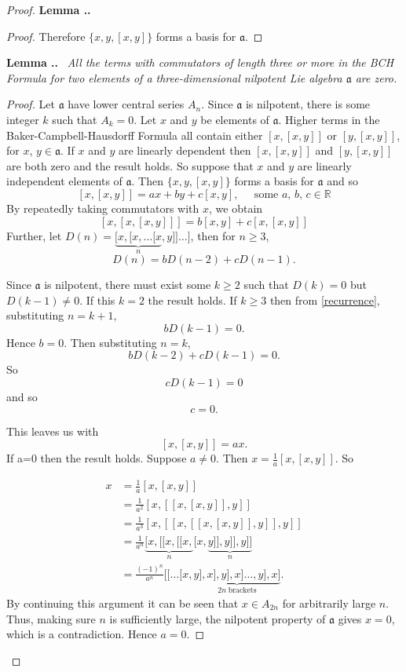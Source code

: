\documentclass[honours]{UNSWthesis}
\newcommand{\R}{\mathbb{R}}
\newcommand{\1}{\mathbf{e}_{1}}
\newcommand{\2}{\mathbf{e}_{3}}
\newcommand{\3}{\mathbf{e}_{3}}
\newcounter{Item}[section]
\newenvironment{Lemma}{\medskip
                            \refstepcounter{Item}
                            \noindent
                           {\bf Lemma \thesection.\theItem.}\ %
                            \begingroup \sl}
                           {\endgroup\medskip}
\begin{document}
\begin{proof}
\begin{Lemma}
\begin{proof}
 Therefore $\{x,y,[x,y]\}$ forms a basis for $\mathfrak{a}$.
\end{proof}
\end{Lemma}

\begin{Lemma}
All the terms with commutators of length three or more in the BCH Formula for two elements of a three-dimensional nilpotent Lie algebra $\mathfrak{a}$ are zero.

\begin{proof} 
Let $\mathfrak{a}$ have lower central series $A_{n}$. Since $\mathfrak{a}$ is nilpotent, there is some integer $k$ such that $A_{k}=0$.\newline
Let $x$ and $y$ be elements of $\mathfrak{a}$.
Higher terms in the Baker-Campbell-Hausdorff Formula all contain either $[x,[x,y]]$ or $[y,[x,y]]$, for $x$, $y \in \mathfrak{a}$. If $x$ and $y$ are linearly dependent then $[x,[x,y]]$ and $[y,[x,y]]$ are both zero and the result holds. So suppose that $x$ and $y$ are linearly independent elements of $\mathfrak{a}$. Then $\{x,y,[x,y]\}$ forms a basis for $\mathfrak{a}$ and so
\[
[x,[x,y]]=ax+by+c[x,y], \;\;\;\;\; \text{some $a$, $b$, $c \in \R$}
\]
By repeatedly taking commutators with $x$, we obtain
\[
[x,[x,[x,y]]]=b[x,y]+c[x,[x,y]]
\]
Further, let $D(n)=\underbrace{[x,[x,\ldots[x}_{n},y]] \ldots ]$, then for $n \geq 3$,
\begin{equation}\label{recurrence}
D(n)=bD(n-2)+cD(n-1).
\end{equation}

Since $\mathfrak{a}$ is nilpotent, there must exist some $k \geq 2$ such that $D(k)=0$ but $D(k-1) \neq 0$. If this $k=2$ the result holds. If $k \geq 3$ then from \ref{recurrence}, substituting $n=k+1$,
\[
bD(k-1)=0
.\] Hence $b=0$.
Then substituting $n=k$,
\[
bD(k-2)+cD(k-1)=0
.\] So
\[
cD(k-1)=0
\] and so
\[
c=0.
\]

This leaves us with 
\[
[x,[x,y]]=ax.
\]
If a=0 then the result holds. Suppose $a \neq 0$. Then $x=\frac{1}{a}[x,[x,y]]$. So

\begin{align*}
x &= \frac{1}{a}[x,[x,y]] \\
&= \frac{1}{a^{2}}[x,[[x,[x,y]],y]] \\
&=\frac{1}{a^{3}}[x,[[x,[[x,[x,y]],y]],y]] \\
&=\frac{1}{a^{n}}\underbrace{[x,[[x,[[x,}_{n}[x,\underbrace{y]],y]],y]]}_{n}\\
&=\frac{(-1)^{n}}{a^{n}}[[\ldots[x,\underbrace{y],x],y],x]\ldots,y],x]}_{2n\; \text{brackets}} .
\end{align*}
By continuing this argument it can be seen that $x \in A_{2n}$ for arbitrarily large $n$. Thus, making sure $n$ is sufficiently large, the nilpotent property of $\mathfrak{a}$ gives $x=0$, which is a contradiction. Hence $a=0$.


\end{proof}
\end{Lemma}
\end{proof}
\end{document}
